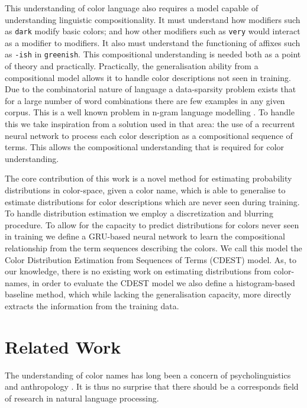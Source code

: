 \documentclass[11pt,a4paper]{article}
\newcommand{\parencite}{\citep}
\begin{document}
This understanding of color language also requires a model capable of understanding linguistic compositionality.
It must understand how modifiers such as \texttt{dark} modify basic colors; and  how other modifiers such as \texttt{very} would interact as a modifier to modifiers.
It also must understand the functioning of affixes such as \texttt{-ish} in \texttt{greenish}.
This compositional understanding is needed both as a point of theory and practically.
Practically, the generalisation ability from a compositional model allows it to handle color descriptions not seen in training.
Due to the combinatorial nature of language a data-sparsity problem exists that
for a large number of word combinations there are few examples in any given corpus.
This is a well known problem in n-gram language modelling \parencite{kneser1995improved,chen1996empirical,rosenfeld2000two}.
To handle this we take inspiration from a solution used in that area: the use of a recurrent neural network \parencite{mikolov2011RnnLM} to process each color description as a compositional sequence of terms.
This allows the compositional understanding that is required for color understanding.


The core contribution of this work is a novel method for estimating probability distributions in color-space, given a color name,
 which is able to generalise to estimate distributions for color descriptions which are never seen during training.
To handle distribution estimation we employ a discretization and blurring procedure.
To allow for the capacity to predict distributions for colors never seen in training we define a GRU-based neural network to learn the compositional relationship from the term sequences describing the colors.
We call this model the Color Distribution Estimation from Sequences of Terms (CDEST) model.
As, to our knowledge, there is no existing work on estimating distributions from color-names, in order to evaluate the CDEST model we also define a histogram-based baseline method, which while lacking the generalisation capacity, more directly extracts the information from the training data.


\section{Related Work}\label{sec:related-work}
The understanding of color names has long been a concern of psycholinguistics and anthropology  \parencite{berlin1969basic,heider1972universals,HEIDER1972337,mylonas2015use}.
It is thus no surprise that there should be a corresponds field of research in natural language processing.
\end{document}
